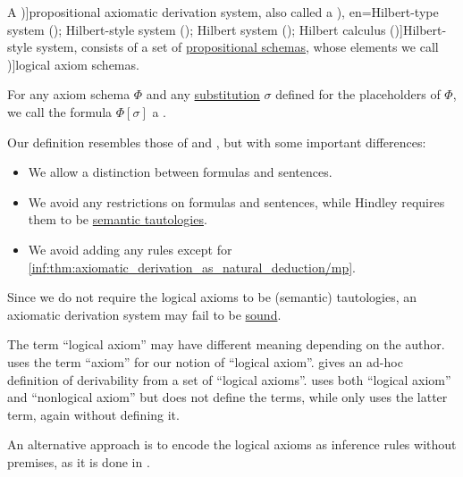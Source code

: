 \begin{definition}\label{def:axiomatic_derivation_system}\mimprovised
  A \term[en=axiomatic system (\cite[6D1]{Hindley1997STT})]{propositional axiomatic derivation system}, also called a \term[ru=исчисление высказываний гильбертовского типа (\cite[35]{Герасимов2011Вычислимость}), en=Hilbert-type system (\cite[80]{Smullyan1995FOL}); Hilbert-style system (\cite[6D1]{Hindley1997STT}); Hilbert system (\cite[33]{TroelstraSchwichtenberg2000Proofs}); Hilbert calculus (\cite[103]{Mimram2020Types})]{Hilbert-style system}, consists of a set of \hyperref[def:propositional_formula_schema]{propositional schemas}, whose elements we call \term[en=axiom schema (\cite[80]{Smullyan1995FOL})]{logical axiom schemas}.

  For any axiom schema \( \Phi \) and any \hyperref[def:propositional_schema_substitution]{substitution} \( \sigma \) defined for the placeholders of \( \Phi \), we call the formula \( \Phi[\sigma] \) a .
\end{definition}
\begin{comments}
  \item Our definition resembles those of  and , but with some important differences:
  \begin{itemize}
    \item We allow a distinction between formulas and sentences.
    \item We avoid any restrictions on formulas and sentences, while Hindley requires them to be \hyperref[def:propositional_tautology]{semantic tautologies}.
    \item We avoid adding any rules except for \ref{inf:thm:axiomatic_derivation_as_natural_deduction/mp}.
  \end{itemize}

  \item Since we do not require the logical axioms to be (semantic) tautologies, an axiomatic derivation system may fail to be \hyperref[def:logical_framework/soundness]{sound}.

  \item The term \enquote{logical axiom} may have different meaning depending on the author.  uses the term \enquote{axiom} for our notion of \enquote{logical axiom}.  gives an ad-hoc definition of derivability from a set of \enquote{logical axioms}.  uses both \enquote{logical axiom} and \enquote{nonlogical axiom} but does not define the terms, while  only uses the latter term, again without defining it.

  \item An alternative approach is to encode the logical axioms as inference rules without premises, as it is done in \cite[103]{Mimram2020Types}.
\end{comments}

